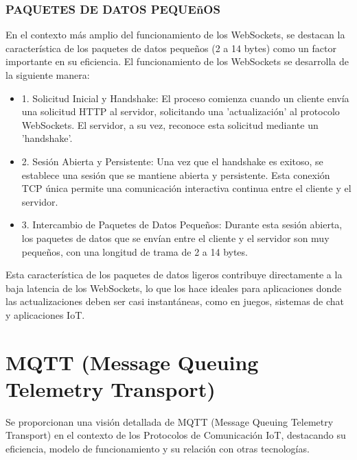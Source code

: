 \documentclass{report}
\begin{document}
\subsubsection{PAQUETES DE DATOS PEQUEñOS}
En el contexto más amplio del funcionamiento de los WebSockets, se  destacan la característica de los paquetes de datos pequeños 
(2 a 14 bytes) como un factor importante en su eficiencia.
El funcionamiento de los WebSockets se desarrolla de la siguiente manera:
\begin{itemize}
    \item 1. Solicitud Inicial y Handshake: El proceso comienza cuando un cliente envía una solicitud HTTP al servidor, solicitando 
    una 'actualización' al protocolo WebSockets. El servidor, a su vez, reconoce esta solicitud mediante un 'handshake'.
    \item 2. Sesión Abierta y Persistente: Una vez que el handshake es exitoso, se establece una sesión que se mantiene abierta y persistente. 
    Esta conexión TCP única permite una comunicación interactiva continua entre el cliente y el servidor.
    \item 3. Intercambio de Paquetes de Datos Pequeños: Durante esta sesión abierta, los paquetes de datos que se envían entre el cliente y el 
    servidor son muy pequeños, con una longitud de trama de 2 a 14 bytes.
\end{itemize}
Esta característica de los paquetes de datos ligeros contribuye directamente a la baja latencia de los WebSockets, lo que los hace ideales para 
aplicaciones donde las actualizaciones deben ser casi instantáneas, como en juegos, sistemas de chat y aplicaciones IoT.

\section{MQTT (Message Queuing Telemetry Transport)}
Se proporcionan una visión detallada de  MQTT (Message Queuing Telemetry Transport)  en el contexto de los Protocolos de Comunicación IoT, 
destacando su eficiencia, modelo de funcionamiento y su relación con otras tecnologías.
\end{document}
